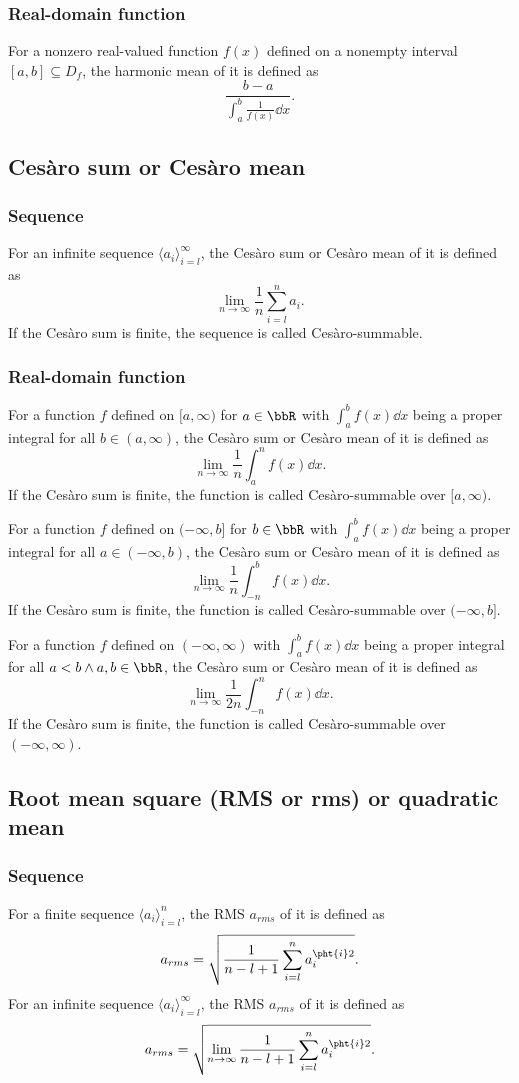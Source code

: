 \documentclass[a4paper,12pt]{report}
\begin{document}
\begin{itemize}
\begin{itemize}
\subsubsection{Real-domain function}
For a nonzero real-valued function $f(x)$ defined on a nonempty interval $[a,b]\subseteq D_f$, the harmonic mean of it is defined as
\[\frac{b-a}{\int_a^b\frac{1}{f(x)}\dd{x}}.\]
\subsection{Cesàro sum or Cesàro mean}
\subsubsection{Sequence}
For an infinite sequence $\langle a_i\rangle_{i=l}^{\infty}$, the Cesàro sum or Cesàro mean of it is defined as
\[\lim_{n\to\infty}\frac{1}{n}\sum_{i=l}^na_i.\]
If the Cesàro sum is finite, the sequence is called Cesàro-summable.
\subsubsection{Real-domain function}
For a function $f$ defined on $[a,\infty)$ for $a\in\bbR$ with $\int_a^bf(x)\dd{x}$ being a proper integral for all $b\in(a,\infty)$, the Cesàro sum or Cesàro mean of it is defined as
\[\lim_{n\to\infty}\frac{1}{n}\int_a^nf(x)\dd{x}.\]
If the Cesàro sum is finite, the function is called Cesàro-summable over $[a,\infty)$.

For a function $f$ defined on $(-\infty,b]$ for $b\in\bbR$ with $\int_a^bf(x)\dd{x}$ being a proper integral for all $a\in(-\infty,b)$, the Cesàro sum or Cesàro mean of it is defined as
\[\lim_{n\to\infty}\frac{1}{n}\int_{-n}^bf(x)\dd{x}.\]
If the Cesàro sum is finite, the function is called Cesàro-summable over $(-\infty,b]$.

For a function $f$ defined on $(-\infty,\infty)$ with $\int_a^bf(x)\dd{x}$ being a proper integral for all $a<b\land a,b\in\bbR$, the Cesàro sum or Cesàro mean of it is defined as
\[\lim_{n\to\infty}\frac{1}{2n}\int_{-n}^nf(x)\dd{x}.\]
If the Cesàro sum is finite, the function is called Cesàro-summable over $(-\infty,\infty)$.
\subsection{Root mean square (RMS or rms) or quadratic mean}
\subsubsection{Sequence}
For a finite sequence $\langle a_i\rangle_{i=l}^n$, the RMS $a_{rms}$ of it is defined as
\[a_{rms}=\sqrt{\frac{1}{n-l+1}\sum_{i=l}^na_i^{\pht{i}2}}.\]
For an infinite sequence $\langle a_i\rangle_{i=l}^{\infty}$, the RMS $a_{rms}$ of it is defined as
\[a_{rms}=\sqrt{\lim_{n\to\infty}\frac{1}{n-l+1}\sum_{i=l}^na_i^{\pht{i}2}}.\]

\end{itemize}
\end{itemize}
\end{document}
